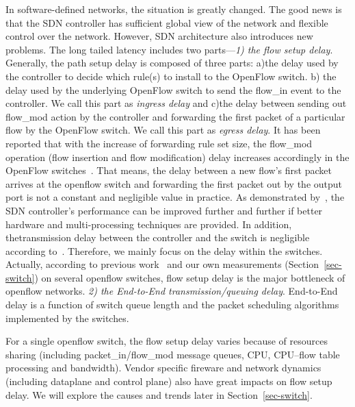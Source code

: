 In software-defined networks, the situation is
greatly changed. The good news is that the SDN
controller has sufficient global view of
the network and flexible control over the
network. However, SDN architecture also
introduces new problems. The long tailed
latency includes two parts---\emph{1) the flow 
setup delay}. Generally, the path setup delay is
composed of three parts: a)the delay used by
the controller to decide which rule(s) to install
to the OpenFlow switch. b) the delay used by
the underlying OpenFlow switch to send the
flow\_in event to the controller. We call this part as \emph{ingress delay} and 
c)the delay between sending out flow\_mod action by the
controller and forwarding the first packet of a
particular flow by the OpenFlow switch.
We call this part as \emph{egress delay}.
It has been reported that with the increase of
forwarding rule set size, the flow\_mod operation
(flow insertion and flow modification) delay increases accordingly
in the OpenFlow switches~\cite{rotsos2012oflops}.
That means, the delay between a new flow's first packet arrives at 
the openflow switch  and
forwarding the first packet out by the output port is
not a constant and negligible value in practice. 
As demonstrated by~\cite{tootoonchian2012controller}, the SDN controller's
performance can be improved further and
further if better hardware and multi-processing
techniques are provided. 
In addition, thetransmission delay between the controller and
the switch is negligible according to~\cite{rotsos2012oflops}.
Therefore, we mainly focus on the delay within
the switches.
Actually, according to previous work~\cite{stephens2012past,curtis2011devoflow,huang2013high} 
and our own measurements (Section~\ref{sec-switch}) on several openflow switches,
flow setup delay is the major bottleneck of openflow networks.
\emph{2) the End-to-End transmission/queuing delay}. End-to-End
delay is a function of switch queue length and
the packet scheduling algorithms implemented
by the switches.

For a single openflow switch, the flow setup delay varies because of resources sharing
(including packet\_in/flow\_mod message queues, CPU, CPU--flow table processing and bandwidth). 
Vendor specific fireware and network dynamics (including dataplane and control plane) 
also have great impacts on flow setup delay. We will explore the causes and trends later in Section~\ref{sec-switch}.


